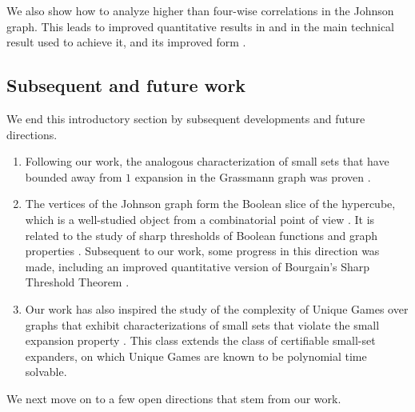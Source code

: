 \documentclass{toc}
\begin{document}
We also show how to analyze higher than four-wise correlations in the Johnson graph. %
This leads to improved quantitative results in
 and in the main technical result used to achieve it,  and its improved form .


\subsection{Subsequent and future work}
We end this introductory section by subsequent developments and future directions.
\begin{enumerate}
  \item Following our work, the analogous characterization of small sets that have bounded away from $1$ expansion in the Grassmann graph was proven \cite{KMS2}.%

  \item The vertices of the Johnson graph %
  form the Boolean slice of the hypercube, which is a well-studied object from a combinatorial point of view \cite{F16a,F16b,FKMW16,FM16}. It is related to the study of sharp thresholds of Boolean functions and graph properties \cite{Bourgain}. Subsequent to our work, some progress in this direction \cite{KLLM} was made, including an improved quantitative version of Bourgain's Sharp Threshold Theorem \cite{Bourgain}.

  \item Our work has also inspired the study of the complexity of Unique Games over graphs that exhibit characterizations of small sets that violate the small expansion property \cite{bafna2021playing,bafna2023solving}. This class extends the class of certifiable
      small-set expanders, on which Unique Games are known to be polynomial time solvable.
\end{enumerate}
We next move on to a few open directions that stem from our work.
\end{document}
